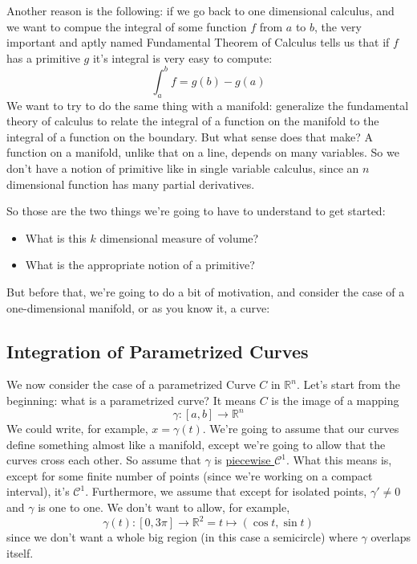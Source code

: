 \documentclass{article}
\newcommand{\reals}[0]{\mathbb{R}}
\newcommand{\mc}[1]{\mathcal{#1}}
\begin{document}
Another reason is the following: if we go back to one dimensional calculus, and we want to compue the integral of some function \(f\) from \(a\) to \(b\), the very important and aptly named Fundamental Theorem of Calculus tells us that if \(f\) has a primitive \(g\) it's integral is very easy to compute:
\begin{equation}
  \int_a^bf = g(b) - g(a)
\end{equation}
We want to try to do the same thing with a manifold: generalize the fundamental theory of calculus to relate the integral of a function on the manifold to the integral of a function on the boundary. But what sense does that make? A function on a manifold, unlike that on a line, depends on many variables. So we don't have a notion of primitive like in single variable calculus, since an \(n\) dimensional function has many partial derivatives.

So those are the two things we're going to have to understand to get started:
\begin{itemize}
  \item What is this \(k\) dimensional measure of volume?
  \item What is the appropriate notion of a primitive?
\end{itemize}
But before that, we're going to do a bit of motivation, and consider the case of a one-dimensional manifold, or as you know it, a curve:

\subsection{Integration of Parametrized Curves}

We now consider the case of a parametrized Curve \(C\) in \(\reals^n\). Let's start from the beginning: what is a parametrized curve? It means \(C\) is the image of a mapping
\begin{equation}
  \gamma : [a, b] \to \reals^n
\end{equation}
We could write, for example, \(x = \gamma(t)\). We're going to assume that our curves define something almost like a manifold, except we're going to allow that the curves cross each other. So assume that \(\gamma\) is \underline{piecewise \(\mc{C}^1\)}. What this means is, except for some finite number of points (since we're working on a compact interval), it's \(\mc{C}^1\). Furthermore, we assume that except for isolated points, \(\gamma' \neq 0\) and \(\gamma\) is one to one.
We don't want to allow, for example,
\begin{equation}
  \gamma(t): [0, 3\pi] \to \reals^2 = t \mapsto (\cos t, \sin t)
\end{equation}
since we don't want a whole big region (in this case a semicircle) where \(\gamma\) overlaps itself.
\end{document}
